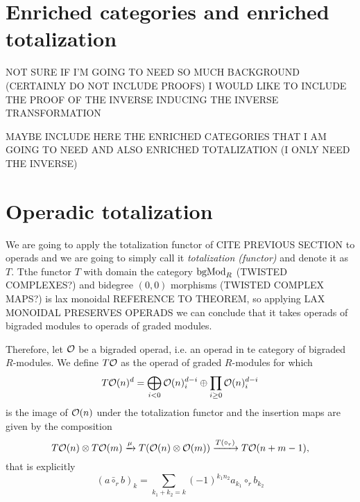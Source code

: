 \documentclass[twoside]{article}
\begin{document}
\section{Enriched categories and enriched totalization}
NOT SURE IF I'M GOING TO NEED SO MUCH BACKGROUND (CERTAINLY DO NOT INCLUDE PROOFS) I WOULD LIKE TO INCLUDE THE PROOF OF THE INVERSE INDUCING THE INVERSE TRANSFORMATION

MAYBE INCLUDE HERE THE ENRICHED CATEGORIES THAT I AM GOING TO NEED AND ALSO ENRICHED TOTALIZATION (I ONLY NEED THE INVERSE)
\section{Operadic totalization}




We are going to apply the totalization  functor of CITE PREVIOUS SECTION to operads and we are going to simply call it \emph{totalization (functor)} and denote it as $T$. Tthe functor $T$ with domain the category $\mathrm{bgMod}_R$ (TWISTED COMPLEXES?) and bidegree $(0,0)$ morphisms (TWISTED COMPLEX MAPS?) is lax monoidal REFERENCE TO THEOREM, so applying LAX MONOIDAL PRESERVES OPERADS we can conclude that it takes operads of bigraded modules to operads of graded modules. 

Therefore, let ${\mathcal O}$ be a bigraded operad, i.e. an operad in te category  of bigraded $R$-modules. We define $T{\mathcal O}$ as the operad of graded $R$-modules for which \[T{\mathcal O}(n)^d=\bigoplus_{i<0}{\mathcal O}(n)^{d-i}_i\oplus\prod_{i\geq 0} {\mathcal O}(n)^{d-i}_i\] is the image of ${\mathcal O}(n)$ under the totalization functor and the insertion maps are given by the composition  %
\[T{\mathcal O}(n)\otimes T{\mathcal O}(m)\xrightarrow{\mu} T({\mathcal O}(n)\otimes {\mathcal O}(m)) \xrightarrow{T(\circ_r)} T{\mathcal O}(n+m-1),\]
that is explicitly 
\[(a\bar{\circ}_rb)_k=\sum_{k_1+k_2=k} (-1)^{k_1n_2} a_{k_1}\circ_r b_{k_2}\]
\end{document}
